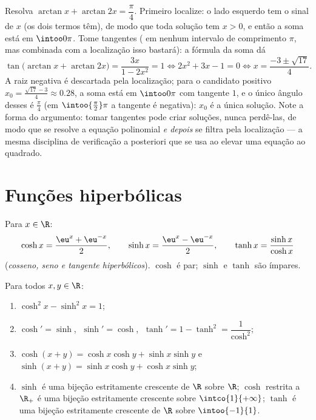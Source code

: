 \begin{example}\label{ex:b1:functions:arctaneq}
Resolva $\arctan x + \arctan 2x = \dfrac\pi4$. Primeiro localize: o
lado esquerdo tem o sinal de $x$ (os dois termos têm), de modo que toda
solução tem $x > 0$, e então a soma está em $\intoo0\pi$. Tome tangentes
( em nenhum intervalo de comprimento $\pi$, mas combinada com a
localização isso bastará): a fórmula da soma dá
\[
\tan\bigl(\arctan x + \arctan 2x\bigr)
= \frac{3x}{1 - 2x^2} = 1
\iff 2x^2 + 3x - 1 = 0
\iff x = \frac{-3 \pm \sqrt{17}}4 .
\]
A raiz negativa é descartada pela localização; para o
candidato positivo $x_0 = \frac{\sqrt{17} - 3}4 \approx 0.28$,
a soma está em $\intoo0\pi$ com tangente $1$, e o único ângulo
desses é $\frac\pi4$ (em $\intoo{\frac\pi2}\pi$ a tangente é
negativa): $x_0$ é a única solução. Note a forma do
argumento: tomar tangentes pode criar soluções, nunca perdê-las,
de modo que se resolve a equação polinomial \emph{e depois} se filtra
pela localização --- a mesma disciplina de verificação a posteriori que
se usa ao elevar uma equação ao quadrado.
\end{example}

\section{Funções hiperbólicas}

\begin{definition}[$\cosh$, $\sinh$, $\tanh$]\label{def:b1:functions:hyperbolic}
Para $x \in \R$:
\[
\cosh x = \frac{\eu^x + \eu^{-x}}{2},
\qquad
\sinh x = \frac{\eu^x - \eu^{-x}}{2},
\qquad
\tanh x = \frac{\sinh x}{\cosh x}
\]
(\emph{cosseno, seno e tangente hiperbólicos}). $\cosh$ é par; $\sinh$ e $\tanh$ são ímpares.
\end{definition}

\begin{proposition}\label{prop:b1:functions:hyprules}
Para todos $x, y \in \R$:
\begin{enumerate}
  \item $\cosh^2 x - \sinh^2 x = 1$;
  \item $\cosh' = \sinh$, $\;\sinh' = \cosh$, $\;\tanh' = 1 - \tanh^2
        = \dfrac{1}{\cosh^2}$;
  \item $\cosh(x+y) = \cosh x\cosh y + \sinh x \sinh y$ e
        $\sinh(x+y) = \sinh x \cosh y + \cosh x \sinh y$;
  \item $\sinh$ é uma bijeção estritamente crescente de $\R$ sobre $\R$;
        $\cosh$ restrita a $\R_+$ é uma bijeção estritamente crescente
        sobre $\intco{1}{+\infty}$; $\tanh$ é uma bijeção estritamente
        crescente de $\R$ sobre $\intoo{-1}{1}$.
\end{enumerate}
\end{proposition}

